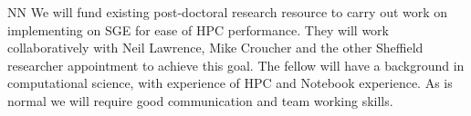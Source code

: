 \begin{participant}[type=R, PM=30]{NN}
  We will fund existing post-doctoral research resource to carry out work on implementing \Jupyter on SGE for ease of HPC performance. They will work collaboratively with Neil Lawrence, Mike Croucher and the other Sheffield researcher appointment to achieve this goal. The fellow will have a background in computational science, with experience of HPC and 
  \Jupyter{} Notebook experience. As is normal we will require good communication and team working
  skills.
\end{participant}